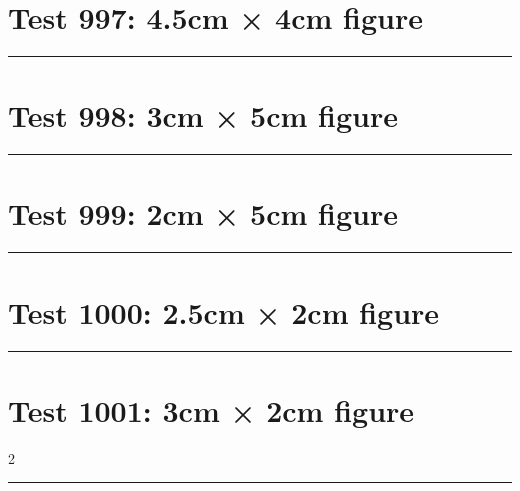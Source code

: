 \documentclass[a4paper,11pt]{article}
\begin{document}
\section*{Test 997: 4.5cm × 4cm figure}
\begin{swarmwrap}%
  \begin{minipage}[t]{4cm}
    \centering
    \rule{\linewidth}{4cm}
  \end{minipage}%
\end{swarmwrap}%
\swarmwrapnext
\lipsum[127]
\lipsum[128]
\lipsum[129]
\lipsum[130]
\lipsum[131]
\section*{Test 998: 3cm × 5cm figure}
\begin{swarmwrap}%
  \begin{minipage}[t]{3cm}
    \centering
    \rule{\linewidth}{5cm}
  \end{minipage}%
\end{swarmwrap}%
\swarmwrapnext
\lipsum[105]
\lipsum[106]
\lipsum[107]
\lipsum[108]
\section*{Test 999: 2cm × 5cm figure}
\begin{swarmwrap}%
  \begin{minipage}[t]{2cm}
    \centering
    \rule{\linewidth}{5cm}
  \end{minipage}%
\end{swarmwrap}%
\swarmwrapnext
\lipsum[35]
\lipsum[36]
\lipsum[37]
\lipsum[38]
\section*{Test 1000: 2.5cm × 2cm figure}
\begin{swarmwrap}%
  \begin{minipage}[t]{2cm}
    \centering
    \rule{\linewidth}{2cm}
  \end{minipage}%
\end{swarmwrap}%
\swarmwrapnext
\lipsum[33]
\lipsum[34]
\lipsum[35]
\lipsum[36]
\section*{Test 1001: 3cm × 2cm figure}
\begin{multicols}{2}
  \begin{swarmwrap}%
    \begin{minipage}[t]{3cm}
      \centering
      \rule{\linewidth}{2cm}
    \end{minipage}%
  \end{swarmwrap}%
  \swarmwrapnext
  \lipsum[67]
  \lipsum[68]
  \lipsum[69]
  \lipsum[70]
  \lipsum[71]
  \lipsum[72]
\end{multicols}
\end{document}
